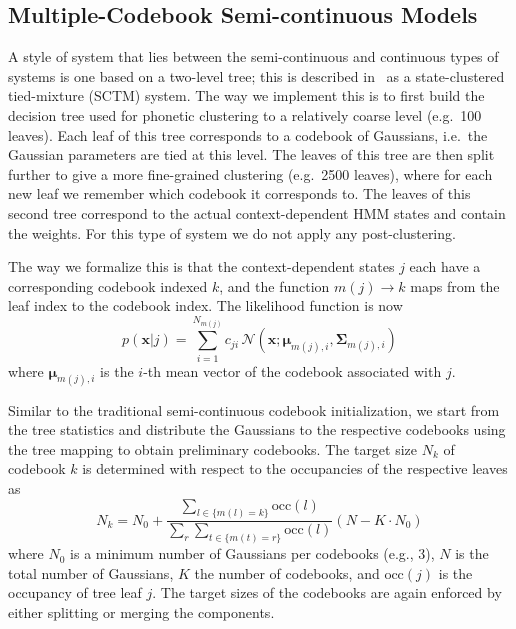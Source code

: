 \documentclass{article}
\def \x{{\mathbf x}}
\def \m{{\bm \mu}}
\def \k{{\mathbf \Sigma}}
\def \nv{{\mathcal N}}
\begin{document}
\subsection{Multiple-Codebook Semi-continuous Models}
A style of system that lies between the semi-continuous and continuous types of
systems is one based on a two-level tree; this is described in~\cite{prasad2004t2b}
as a state-clustered tied-mixture (SCTM) system. The way we implement this is
to first build the decision tree used for phonetic clustering to a relatively
coarse level (e.g.~100 leaves). Each leaf of this tree corresponds to a codebook of Gaussians, i.e.~the Gaussian parameters are tied at this level. The leaves 
of this tree are then split further to give a more fine-grained clustering (e.g.~2500 leaves), where for each new leaf we remember which codebook it corresponds to. The leaves of this second tree correspond to the actual context-dependent HMM states and contain the weights.
For this type of system we do not apply any post-clustering.

The way we formalize this is that the context-dependent states $j$ each have 
a corresponding codebook indexed $k$, and the function $m(j) \rightarrow k$ 
maps from the leaf index to the codebook index. The likelihood function is now
%
\begin{equation}
p(\x | j) = \sum_{i=1}^{N_{m(j)}} c_{ji} \, \nv\left(\x; \m_{m(j), i}, \k_{m(j), i}\right)
\end{equation}
%
where $\m_{m(j), i}$ is the $i$-th mean vector of the codebook
associated with $j$.

Similar to the traditional semi-continuous codebook initialization, we start
from the tree statistics and distribute the Gaussians to the respective codebooks
using the tree mapping to obtain preliminary codebooks.
The target size $N_k$ of codebook $k$ is determined with respect to 
the occupancies of the respective leaves as
\begin{equation}
N_k = N_0 + \frac
  { \sum_{l \in \{m(l) = k\}} \text{occ}(l) }
  { \sum_r \sum_{t \in \{m(t) = r\}} \text{occ}(l) } 
  \left( N - K \cdot N_0 \right)
\end{equation}
where $N_0$ is a minimum number of Gaussians per codebooks (e.g., 3), $N$ is
the total number of Gaussians, $K$ the number of codebooks, and $\text{occ}(j)$ 
is the occupancy of tree leaf $j$. 
%
%
The target sizes of the codebooks are again enforced by either splitting or
merging the components.
\end{document}

